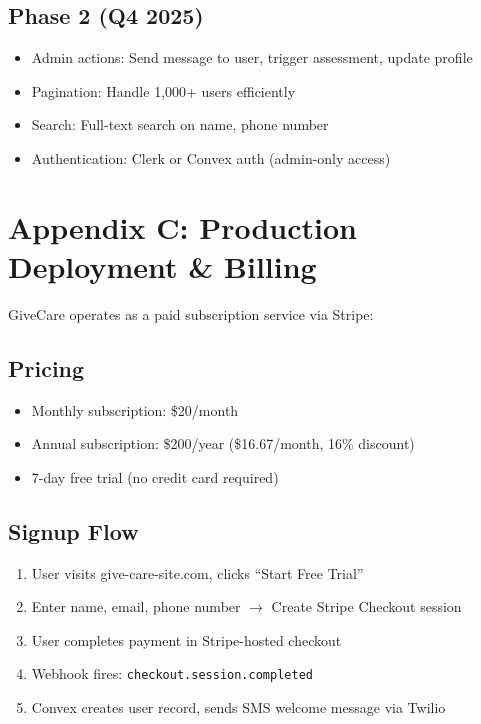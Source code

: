 \documentclass{article}
\begin{document}
\subsection*{Phase 2 (Q4 2025)}
\begin{itemize}
    \item Admin actions: Send message to user, trigger assessment, update profile
    \item Pagination: Handle 1,000+ users efficiently
    \item Search: Full-text search on name, phone number
    \item Authentication: Clerk or Convex auth (admin-only access)
\end{itemize}
%
\section*{Appendix C: Production Deployment \& Billing}

GiveCare operates as a paid subscription service via Stripe:

\subsection*{Pricing}
\begin{itemize}
    \item Monthly subscription: \$20/month
    \item Annual subscription: \$200/year (\$16.67/month, 16\% discount)
    \item 7-day free trial (no credit card required)
\end{itemize}

\subsection*{Signup Flow}
\begin{enumerate}
    \item User visits give-care-site.com, clicks ``Start Free Trial''
    \item Enter name, email, phone number $\rightarrow$ Create Stripe Checkout session
    \item User completes payment in Stripe-hosted checkout
    \item Webhook fires: \texttt{checkout.session.completed}
    \item Convex creates user record, sends SMS welcome message via Twilio
\end{enumerate}
\end{document}
